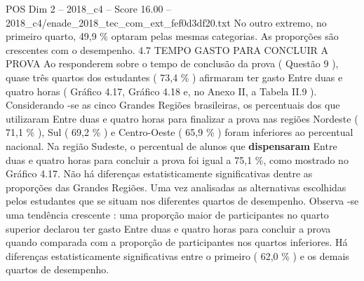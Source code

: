 \begin{textsample}{POS Dim 2 – 2018\_c4 – Score 16.00 – 2018\_c4/enade\_2018\_tec\_com\_ext\_fef0d3df20.txt}
No outro extremo, no primeiro quarto, 49,9 \% optaram pelas mesmas categorias.
As proporções são crescentes com o desempenho. 4.7 TEMPO GASTO PARA CONCLUIR A PROVA Ao responderem sobre o tempo de conclusão da prova ( Questão 9 ), quase três quartos dos estudantes ( 73,4 \% ) afirmaram ter gasto Entre duas e quatro horas ( Gráfico 4.17, Gráfico 4.18 e, no Anexo II, a Tabela II.9 ).
Considerando -se as cinco Grandes Regiões brasileiras, os percentuais dos que utilizaram Entre duas e quatro horas para finalizar a prova nas regiões Nordeste ( 71,1 \% ), Sul ( 69,2 \% ) e Centro-Oeste ( 65,9 \% ) foram inferiores ao percentual nacional.
Na região Sudeste, o percentual de alunos que \textbf{dispensaram} Entre duas e quatro horas para concluir a prova foi igual a 75,1 \%, como mostrado no Gráfico 4.17.
Não há diferenças estatisticamente significativas dentre as proporções das Grandes Regiões.
Uma vez analisadas as alternativas escolhidas pelos estudantes que se situam nos diferentes quartos de desempenho.
Observa -se uma tendência crescente : uma proporção maior de participantes no quarto superior declarou ter gasto Entre duas e quatro horas para concluir a prova quando comparada com a proporção de participantes nos quartos inferiores.
Há diferenças estatisticamente significativas entre o primeiro ( 62,0 \% ) e os demais quartos de desempenho.

\end{textsample}
